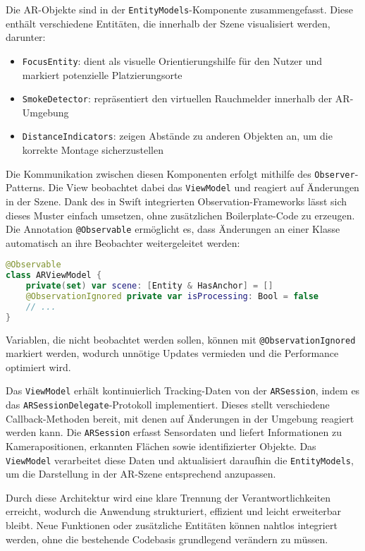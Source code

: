 Die AR-Objekte sind in der \texttt{EntityModels}-Komponente zusammengefasst. Diese enthält verschiedene Entitäten, die innerhalb der Szene visualisiert werden, darunter:

\begin{itemize}
    \item \texttt{FocusEntity}: dient als visuelle Orientierungshilfe für den Nutzer und markiert potenzielle Platzierungsorte
    \item \texttt{SmokeDetector}: repräsentiert den virtuellen Rauchmelder innerhalb der AR-Umgebung
    \item \texttt{DistanceIndicators}: zeigen Abstände zu anderen Objekten an, um die korrekte Montage sicherzustellen
\end{itemize}

Die Kommunikation zwischen diesen Komponenten erfolgt mithilfe des \texttt{Observer}-Patterns. Die View beobachtet dabei das \texttt{ViewModel} und reagiert auf Änderungen in der Szene. Dank des in Swift integrierten Observation-Frameworks lässt sich dieses Muster einfach umsetzen, ohne zusätzlichen Boilerplate-Code zu erzeugen. Die Annotation \texttt{@Observable} ermöglicht es, dass Änderungen an einer Klasse automatisch an ihre Beobachter weitergeleitet werden:

\begin{lstlisting}[language=Swift]
@Observable
class ARViewModel {
    private(set) var scene: [Entity & HasAnchor] = []
    @ObservationIgnored private var isProcessing: Bool = false
    // ...
}
\end{lstlisting}

Variablen, die nicht beobachtet werden sollen, können mit \texttt{@ObservationIgnored} markiert werden, wodurch unnötige Updates vermieden und die Performance optimiert wird.

Das \texttt{ViewModel} erhält kontinuierlich Tracking-Daten von der \texttt{ARSession}, indem es das \texttt{ARSessionDelegate}-Protokoll implementiert. Dieses stellt verschiedene Callback-Methoden bereit, mit denen auf Änderungen in der Umgebung reagiert werden kann. Die \texttt{ARSession} erfasst Sensordaten und liefert Informationen zu Kamerapositionen, erkannten Flächen sowie identifizierter Objekte. Das \texttt{ViewModel} verarbeitet diese Daten und aktualisiert daraufhin die \texttt{EntityModels}, um die Darstellung in der AR-Szene entsprechend anzupassen.

Durch diese Architektur wird eine klare Trennung der Verantwortlichkeiten erreicht, wodurch die Anwendung strukturiert, effizient und leicht erweiterbar bleibt. Neue Funktionen oder zusätzliche Entitäten können nahtlos integriert werden, ohne die bestehende Codebasis grundlegend verändern zu müssen.

